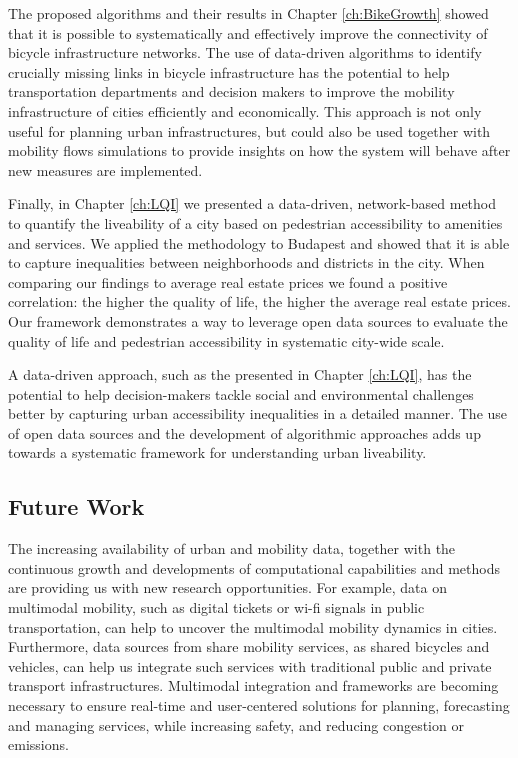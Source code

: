 The proposed algorithms and their results in Chapter \ref{ch:BikeGrowth} showed that it is possible to systematically and effectively improve the connectivity of bicycle infrastructure networks. The use of data-driven algorithms to identify crucially missing links in bicycle infrastructure has the potential to help transportation departments and decision makers to improve the mobility infrastructure of cities efficiently and economically. This approach is not only useful for planning urban infrastructures, but could also be used together with  mobility flows simulations to provide insights on how the system will behave after new measures are implemented.

Finally, in Chapter \ref{ch:LQI} we presented a data-driven, network-based method to quantify the liveability of a city based on pedestrian accessibility to amenities and services. We applied the methodology to Budapest and showed that it is able to capture inequalities between neighborhoods and districts in the city. When comparing our findings to average real estate prices we found a positive correlation: the higher the quality of life, the higher the average real estate prices. Our framework demonstrates a way to leverage open data sources to evaluate the quality of life and pedestrian accessibility in systematic city-wide scale.

A data-driven approach, such as the presented in Chapter \ref{ch:LQI}, has the potential to help decision-makers tackle social and environmental challenges better by capturing urban accessibility inequalities in a detailed manner. The use of open data sources and the development of algorithmic approaches adds up towards a systematic framework for understanding urban liveability.
 

\subsection*{Future Work}

The increasing availability of urban and mobility data, together with the continuous growth and developments of computational capabilities and methods are providing us with new research opportunities. For example, data on multimodal mobility, such as digital tickets or wi-fi signals in public transportation, can help to uncover the multimodal mobility dynamics in cities. Furthermore, data sources from share mobility services, as shared bicycles and vehicles, can help us integrate such services with traditional public and private transport infrastructures. Multimodal integration and frameworks are becoming necessary to ensure real-time and user-centered solutions for planning, forecasting and managing services, while increasing safety, and reducing congestion or emissions.

